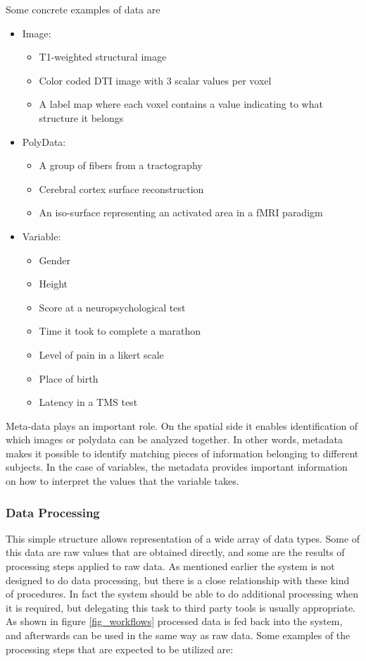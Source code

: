 Some concrete examples of data are
\begin{itemize}
\item Image:
\begin{itemize}
\item T1-weighted structural image
\item Color coded DTI image with 3 scalar values per voxel
\item A label map where each voxel contains a value indicating to what structure it belongs 
\end{itemize}
\item PolyData:
\begin{itemize}
\item A group of fibers from a tractography
\item Cerebral cortex surface reconstruction
\item An iso-surface representing an activated area in a fMRI paradigm
\end{itemize}
\item Variable:
\begin{itemize}
\item Gender
\item Height
\item Score at a neuropsychological test
\item Time it took to complete a marathon
\item Level of pain in a likert scale
\item Place of birth
\item Latency in a TMS test
\end{itemize}
\end{itemize}

Meta-data plays an important role. On the spatial side it enables identification of which images or polydata can be analyzed together. In other words, metadata makes it possible to identify matching pieces of information belonging to different subjects. In the case of variables, the metadata provides important information on how to interpret the values that the variable takes. 

\subsubsection{Data Processing}
This simple structure allows representation of a wide array of data types. Some of this data are raw values that are obtained directly, and some are the results of processing steps applied to raw data. As mentioned earlier the system is not designed to do data processing, but there is a close relationship with these kind of procedures. In fact the system should be able to do additional processing when it is required, but delegating this task to third party tools is usually appropriate. As shown in figure \ref{fig_workflows} processed data is fed back into the system, and afterwards can be used in the same way as raw data. Some examples of the processing steps that are expected to be utilized are:

